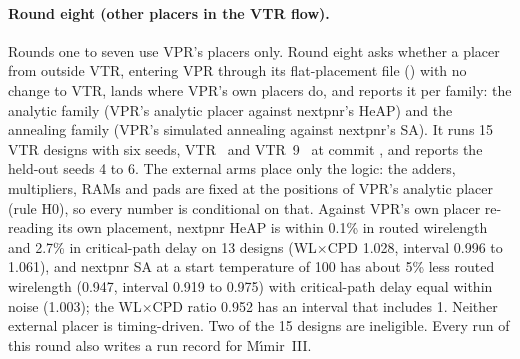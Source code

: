 \paragraph{Round eight (other placers in the VTR flow).} Rounds one to seven use VPR's placers only. Round eight asks whether a placer from outside VTR, entering VPR through its flat-placement file () with no change to VTR, lands where VPR's own placers do, and reports it per family: the analytic family (VPR's analytic placer against nextpnr's HeAP) and the annealing family (VPR's simulated annealing against nextpnr's SA). It runs 15 VTR designs with six seeds, VTR~\cite{rose2012vtr} and VTR~9~\cite{elgammal2025vtr9} at commit , and reports the held-out seeds 4 to 6. The external arms place only the logic: the adders, multipliers, RAMs and pads are fixed at the positions of VPR's analytic placer (rule H0), so every number is conditional on that. Against VPR's own placer re-reading its own placement, nextpnr HeAP is within 0.1\% in routed wirelength and 2.7\% in critical-path delay on 13 designs (WL$\times$CPD 1.028, interval 0.996 to 1.061), and nextpnr SA at a start temperature of 100 has about 5\% less routed wirelength (0.947, interval 0.919 to 0.975) with critical-path delay equal within noise (1.003); the WL$\times$CPD ratio 0.952 has an interval that includes 1. Neither external placer is timing-driven. Two of the 15 designs are ineligible. Every run of this round also writes a run record for M\'{\i}mir~III.
